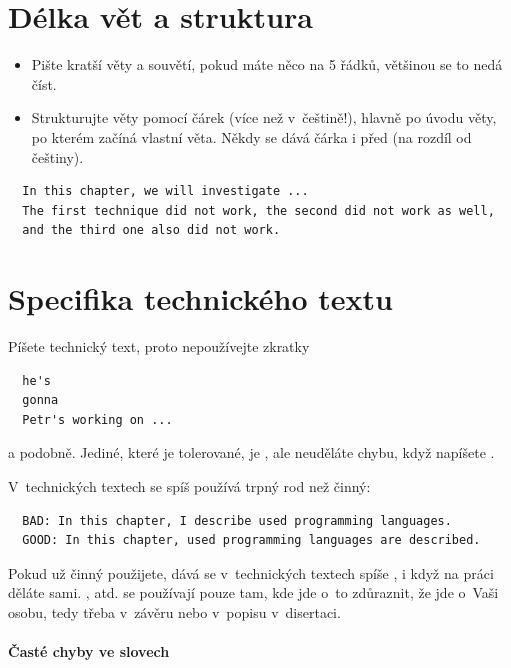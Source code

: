 \section*{Délka vět a struktura}

\begin{itemize}
  \item{Pište kratší věty a souvětí, pokud máte něco na 5 řádků, většinou se to nedá číst.}
  \item{Strukturujte věty pomocí čárek (více než v~češtině!), hlavně po úvodu věty, po kterém začíná vlastní věta. Někdy se dává čárka i před  (na rozdíl od češtiny).}
\end{itemize}
\begin{verbatim}
  In this chapter, we will investigate ... 
  The first technique did not work, the second did not work as well, 
  and the third one also did not work. 
\end{verbatim}

\section*{Specifika technického textu}

Píšete technický text, proto nepoužívejte zkratky
\begin{verbatim}
  he's
  gonna
  Petr's working on ...
\end{verbatim}
\noindent a podobně. Jediné, které je tolerované, je , ale neuděláte chybu, když napíšete . 

\begin{samepage}
\noindent V~technických textech se spíš používá trpný rod než činný: 
\begin{verbatim}
  BAD: In this chapter, I describe used programming languages. 
  GOOD: In this chapter, used programming languages are described.
\end{verbatim}
\end{samepage}

Pokud už činný použijete, dává se v~technických textech spíše , i když na práci děláte sami. ,  atd. se používají pouze tam, kde jde o~to zdůraznit, že jde o~Vaši osobu, tedy třeba v~závěru nebo v~popisu  v~disertaci.

\paragraph{Časté chyby ve slovech}

